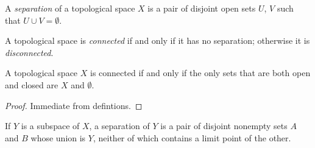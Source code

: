 \begin{definition}[Separation]
    A \emph{separation} of a topological space $X$ is a pair of disjoint open sets $U$, $V$ such that $U \cup V = \emptyset$.
\end{definition}

\begin{definition}[Connected]
    A topological space is \emph{connected} if and only if it has no separation; otherwise it is \emph{disconnected}.
\end{definition}

\begin{proposition}
    \label{proposition:open_closed_connective}
    A topological space $X$ is connected if and only if the only sets that are both open and closed are $X$ and $\emptyset$.
\end{proposition}

\begin{proof}
    Immediate from defintions.
\end{proof}

\begin{lemma}
    \label{lemma:limit_point_separation}
    If $Y$ is a subspace of $X$, a separation of $Y$ is a pair of disjoint nonempty sets $A$ and $B$ whose union is $Y$, neither of which contains a limit point of the other.
\end{lemma}

